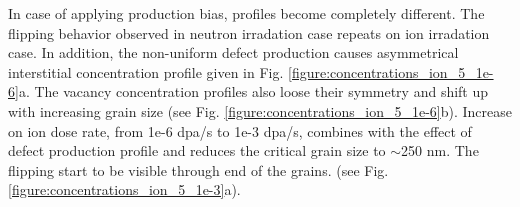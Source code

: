 \documentclass[a4paper]{article}
\begin{document}
      \newpage
      In case of applying production bias, profiles become completely different. The flipping behavior observed in neutron irradation case repeats on ion irradation case. In addition, the non-uniform defect production causes asymmetrical interstitial concentration profile given in Fig. \ref{figure:concentrations_ion_5_1e-6}a. The vacancy concentration profiles also loose their symmetry and shift up with increasing grain size (see Fig. \ref{figure:concentrations_ion_5_1e-6}b). Increase on ion dose rate, from 1e-6 dpa/s to 1e-3 dpa/s, combines with the effect of defect production profile and reduces the critical grain size to ${\sim}$250 nm. The flipping start to be visible through end of the grains. (see Fig. \ref{figure:concentrations_ion_5_1e-3}a).
      \begin{figure}[h!]  %
        \centering
        \qquad

\end{figure}
\end{document}
